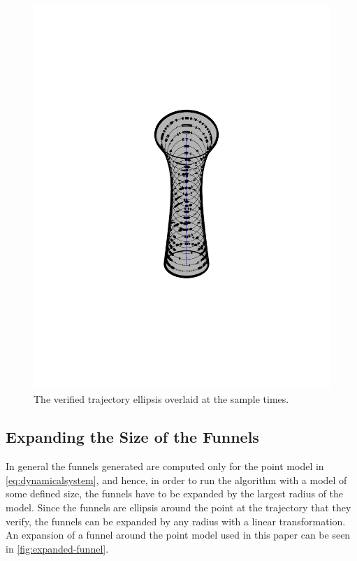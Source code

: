 \begin{figure}[!t]
  \begin{minipage}[r]{.45\columnwidth}
    \includegraphics[trim={-5cm 5cm -5cm 5cm},
    width=.9\columnwidth,
    scale=20]{figures/method/funnel-sampled}
    \caption{The verified trajectory ellipsis overlaid at the sample times.}
    \label{fig:funnel-straight-sampled}
  \end{minipage}
\end{figure}


\subsection{Expanding the Size of the Funnels}

In general the funnels generated are computed only for the point model in
\cref{eq:dynamicalsystem}, and hence, in order to run the algorithm with a
model of some defined size, the funnels have to be expanded by the largest
radius of the model. Since the funnels are ellipsis around the point at the
trajectory that they verify, the funnels can be expanded by any radius with a
linear transformation. An expansion of a funnel around the point model used in
this paper can be seen in \cref{fig:expanded-funnel}.


